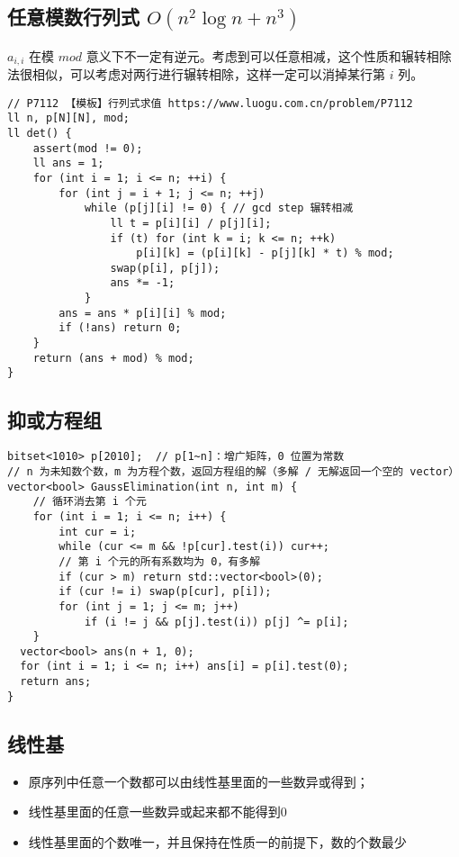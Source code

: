 \subsection{任意模数行列式 $O(n^2\log n + n^3)$ }
\par \noindent  $a_{i,i}$ 在模 $mod$ 意义下不一定有逆元。考虑到可以任意相减，这个性质和辗转相除法很相似，可以考虑对两行进行辗转相除，这样一定可以消掉某行第 $i$ 列。
\begin{verbatim}
// P7112 【模板】行列式求值 https://www.luogu.com.cn/problem/P7112
ll n, p[N][N], mod;
ll det() {
    assert(mod != 0);
    ll ans = 1;
    for (int i = 1; i <= n; ++i) {
        for (int j = i + 1; j <= n; ++j) 
            while (p[j][i] != 0) { // gcd step 辗转相减
                ll t = p[i][i] / p[j][i];
                if (t) for (int k = i; k <= n; ++k)
                    p[i][k] = (p[i][k] - p[j][k] * t) % mod;
                swap(p[i], p[j]);
                ans *= -1;
            }
        ans = ans * p[i][i] % mod;
        if (!ans) return 0;
    }
    return (ans + mod) % mod;
}
\end{verbatim}
\subsection{抑或方程组}
\begin{verbatim}
bitset<1010> p[2010];  // p[1~n]：增广矩阵，0 位置为常数
// n 为未知数个数，m 为方程个数，返回方程组的解（多解 / 无解返回一个空的 vector）
vector<bool> GaussElimination(int n, int m) {
    // 循环消去第 i 个元
    for (int i = 1; i <= n; i++) {
        int cur = i;
        while (cur <= m && !p[cur].test(i)) cur++;
        // 第 i 个元的所有系数均为 0，有多解
        if (cur > m) return std::vector<bool>(0);
        if (cur != i) swap(p[cur], p[i]);
        for (int j = 1; j <= m; j++)
            if (i != j && p[j].test(i)) p[j] ^= p[i];
    }
  vector<bool> ans(n + 1, 0);
  for (int i = 1; i <= n; i++) ans[i] = p[i].test(0);
  return ans;
}
\end{verbatim}
\subsection{线性基}
\begin{itemize}
\item 原序列中任意一个数都可以由线性基里面的一些数异或得到；

\item 线性基里面的任意一些数异或起来都不能得到0

\item 线性基里面的个数唯一，并且保持在性质一的前提下，数的个数最少
\end{itemize}

